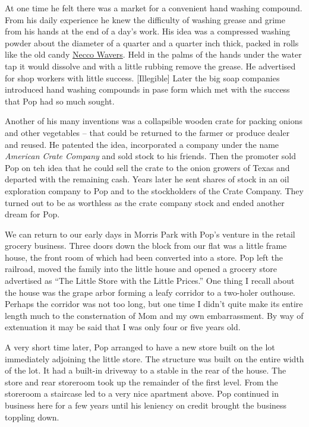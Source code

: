 \documentclass[12pt]{book}              %
\begin{document}
At one time he felt there was a market for a convenient hand washing compound. From his daily experience he knew the difficulty of washing grease and grime from his hands at the end of a day's work. His idea was a compressed washing powder about the diameter of a quarter and a quarter inch thick, packed in rolls like the old candy \href{http://en.wikipedia.org/wiki/Necco_Wafers}{Necco Wavers}. Held in the palms of the hands under the water tap it would dissolve and with a little rubbing remove the grease. He advertised for shop workers with little success. [Illegible] Later the big soap companies introduced hand washing compounds in pase form which met with the success that Pop had so much sought. 

Another of his many inventions was a collapsible wooden crate for packing onions and other vegetables -- that could be returned to the farmer or produce dealer and reused. He patented the idea, incorporated a company under the name {\it American Crate Company} and sold stock to his friends. Then the promoter sold Pop on teh idea that he could sell the crate to the onion growers of Texas and departed with the remaining cash. Years later he sent shares of stock in an oil exploration company to Pop and to the stockholders of the Crate Company. They turned out to be as worthless as the crate company stock and ended another dream for Pop. 

We can return to our early days in Morris Park with Pop's venture in the retail grocery business. Three doors down the block from our flat was a little frame house, the front room of which had been converted into a store. Pop left the railroad, moved the family into the little house and opened a grocery store advertised as ``The Little Store with the Little Prices.'' One thing I recall about the house was the grape arbor forming a leafy corridor to a two-holer outhouse. Perhaps the corridor was not too long, but one time I didn't quite make its entire length much to the consternation of Mom and my own embarrassment. By way of extenuation it may be said that I was only four or five years old. 

A very short time later, Pop arranged to have a new store built on the lot immediately adjoining the little store. The structure was built on the entire width of the lot. It had a built-in driveway to a stable in the rear of the house. The store and rear storeroom took up the remainder of the first level. From the storeroom a staircase led to a very nice apartment above. Pop continued in business here for a few years until his leniency on credit brought the business toppling down.
\end{document}
